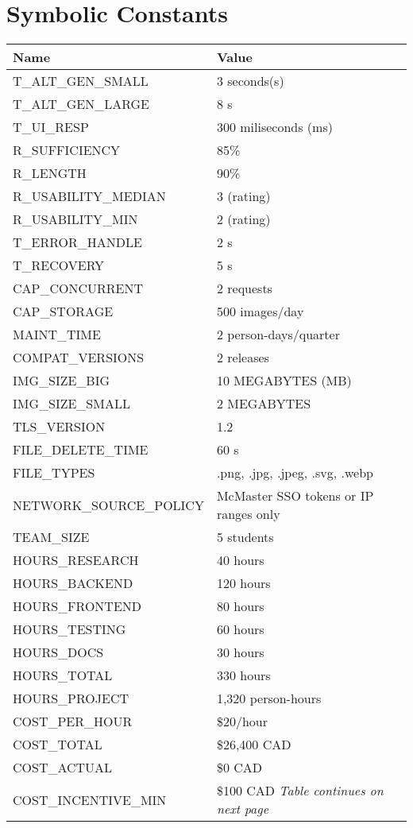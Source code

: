 \documentclass[12pt, titlepage]{article}
\begin{document}
\section*{Symbolic Constants}
\begin{longtable}{|p{8.0cm}|p{8.0cm}|}
  \toprule
  {\textbf{Name}} & {\textbf{Value}}\\
  \midrule
  T\_ALT\_GEN\_SMALL & 3 seconds(s) \\
  T\_ALT\_GEN\_LARGE & 8 s \\
  T\_UI\_RESP & 300 miliseconds (ms) \\
  R\_SUFFICIENCY & 85\% \\
  R\_LENGTH & 90\% \\
  R\_USABILITY\_MEDIAN & 3 (rating) \\
  R\_USABILITY\_MIN & 2 (rating) \\
  T\_ERROR\_HANDLE & 2 s \\
  T\_RECOVERY & 5 s \\
  CAP\_CONCURRENT & 2 requests \\
  CAP\_STORAGE & 500 images/day \\
  MAINT\_TIME & 2 person-days/quarter \\
  COMPAT\_VERSIONS & 2 releases \\
  IMG\_SIZE\_BIG & 10 MEGABYTES (MB) \\
  IMG\_SIZE\_SMALL & 2 MEGABYTES \\
  TLS\_VERSION & 1.2 \\
  FILE\_DELETE\_TIME & 60 s \\
  FILE\_TYPES & .png, .jpg, .jpeg, .svg, .webp \\
  NETWORK\_SOURCE\_POLICY & McMaster SSO tokens or IP ranges only\\
  TEAM\_SIZE & 5 students \\
  HOURS\_RESEARCH & 40 hours \\
  HOURS\_BACKEND & 120 hours \\
  HOURS\_FRONTEND & 80 hours \\
  HOURS\_TESTING & 60 hours \\
  HOURS\_DOCS & 30 hours \\
  HOURS\_TOTAL & 330 hours \\
  HOURS\_PROJECT & 1,320 person-hours \\
  COST\_PER\_HOUR & \$20/hour \\
  COST\_TOTAL & \$26,400 CAD \\
  COST\_ACTUAL & \$0 CAD \\
  COST\_INCENTIVE\_MIN & \$100 CAD \qquad\textit{Table continues on next page}\\

\end{longtable}
\end{document}

